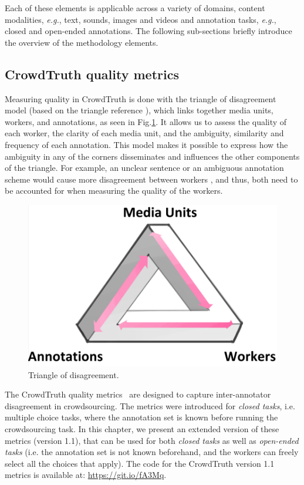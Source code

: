 Each of these elements is applicable across a variety of domains, content modalities, \emph{e.g.}, text, sounds, images and videos and annotation tasks, \emph{e.g.}, closed and open-ended annotations. The following sub-sections briefly introduce the overview of the methodology elements.

\subsection{CrowdTruth quality metrics}
\label{subsec:metrics}

Measuring quality in CrowdTruth is done with  the triangle of disagreement model (based on the triangle reference \cite{knowlton1966definition}), which links together media units, workers, and annotations, as seen in Fig.\ref{fig:triangle_of_reference}. It allows us to assess the quality of each worker, the clarity of each media unit, and the ambiguity, similarity and frequency of each annotation. This model makes it possible to express how the ambiguity in any of the corners disseminates and influences the other components of the triangle. For example, an unclear sentence or an ambiguous annotation scheme would cause more disagreement between workers \cite{aroyo2014threesides}, and thus, both need to be accounted for when measuring the quality of the workers. 

 \begin{figure}[!hpt]
 	\centering
 		\includegraphics[width=0.5\linewidth]{img/triangle.png}
 	\caption{Triangle of disagreement.}
 	\label{fig:triangle_of_reference}
 \end{figure}

The CrowdTruth quality metrics~\cite{aroyo2014threesides} are designed to capture inter-annotator disagreement in crowdsourcing. The metrics were introduced for \textit{closed tasks}, i.e. multiple choice tasks, where the annotation set is known before running the crowdsourcing task. In this chapter, we present an extended version of these metrics (version 1.1), that can be used for both \textit{closed tasks} as well as \textit{open-ended tasks} (i.e. the annotation set is not known beforehand, and the workers can freely select all the choices that apply). The code for the CrowdTruth version 1.1 metrics is available at: \url{https://git.io/fA3Mq}.

